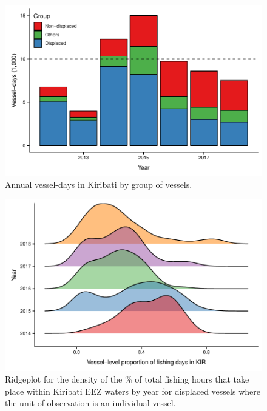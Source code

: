 \documentclass[9p,twocolumn,twoside,lineno]{pnas-new}
\begin{document}
\begin{figure}[H]
\centering
\includegraphics{img/all_PS_VDS_KIR_year.pdf}
\caption{\label{fig:all_PS_VDS_KIR_year}Annual vessel-days in Kiribati by group of vessels.}
\end{figure}

\begin{figure}[H]
\centering
	\includegraphics{img/hist_kir_fishing.pdf}
	\caption{\label{fig:hist_kir_fishing}Ridgeplot for the density of the \% of total fishing hours that take place within Kiribati EEZ waters by year for displaced vessels where the unit of observation is an individual vessel.}	
\end{figure}
\end{document}
